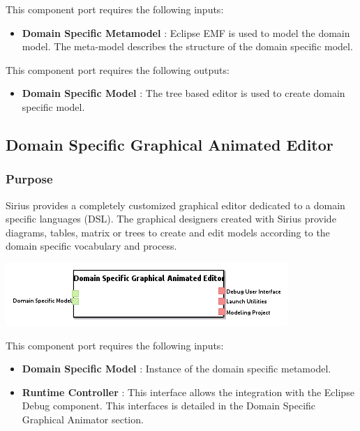 \documentclass{gemoc} %
\begin{document}
This component port requires the following inputs:
\begin{itemize}
  \item \textbf{Domain Specific Metamodel} :
Eclipse EMF is used to model the domain model. The meta-model describes the structure of the domain specific model.
\end{itemize}

This component port requires the following outputs:
\begin{itemize}
  \item \textbf{Domain Specific Model} :
The tree based editor is used to create domain specific model.
\end{itemize}

\subsection{Domain Specific Graphical Animated Editor}


\subsubsection{Purpose}
Sirius provides a completely customized graphical editor dedicated to a domain specific languages (DSL). The graphical designers created with Sirius
provide diagrams, tables, matrix or trees to create and edit models according to the domain specific vocabulary and process.
\begin{center}
\includegraphics*[trim=0.0cm 0.0cm 0cm 0.0cm, clip=true]{../images/generated/Generated_Domain_Specific_Graphical_Animated_Editor.png}
\end{center}

This component port requires the following inputs:
\begin{itemize}
  \item \textbf{Domain Specific Model} :
Instance of the domain specific metamodel.
  \item \textbf{Runtime Controller} :
This interface allows the integration with the Eclipse Debug component. This interfaces is detailed in the Domain Specific Graphical Animator section.
\end{itemize}
\end{document}
